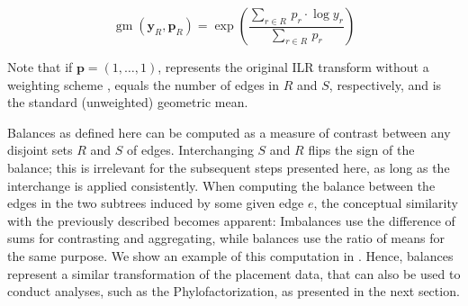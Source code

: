 \begin{equation}
    \label{ch:MaterialsMethods:sec:Balances:eq:GeometricMean}
    \operatorname{gm}( \bm{y}_R, \bm{p}_R ) = \exp \left( \frac{ \sum_{r \in R} \, p_r \cdot \log y_r }{ \sum_{r \in R} \, p_r } \right)
\end{equation}

Note that if $\bm{p} = ( 1, \ldots, 1 )$, %
represents the original ILR transform without a weighting scheme \cite{Egozcue2003},
 equals the number of edges in $R$ and $S$, respectively,
and  is the standard (unweighted) geometric mean.

Balances as defined here can be computed as a measure of contrast between any disjoint sets $R$ and $S$ of edges.
Interchanging $S$ and $R$ flips the sign of the balance;
this is irrelevant for the subsequent steps presented here, as long as the interchange is applied consistently.
When computing the balance between the edges in the two subtrees induced by some given edge $e$,
the conceptual similarity with the previously described  becomes apparent:
Imbalances use the difference of sums for contrasting and aggregating,
while balances use the ratio of means for the same purpose.
We show an example of this computation in .
Hence, balances represent a similar transformation of the placement data,
that can also be used to conduct analyses, such as the Phylofactorization, as presented in the next section.

